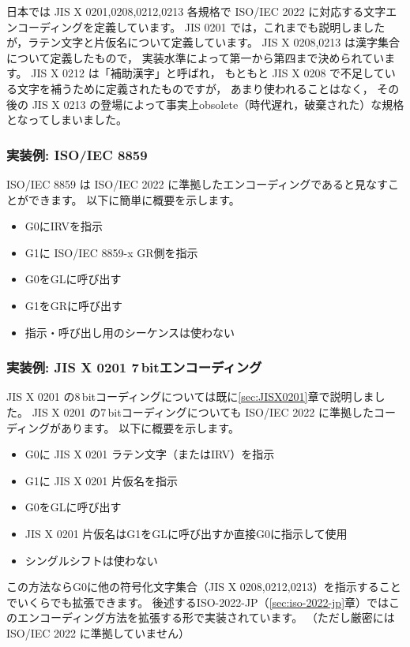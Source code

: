 \documentclass[a4j,10pt,fleqn,uplatex]{jsarticle}
\begin{document}
日本では JIS X 0201,0208,0212,0213 各規格で ISO/IEC 2022 に対応する文字エンコーディングを定義しています。
JIS 0201 では，これまでも説明しましたが，ラテン文字と片仮名について定義しています。
JIS X 0208,0213 は漢字集合について定義したもので，
実装水準によって第一から第四まで決められています。
JIS X 0212 は「補助漢字」と呼ばれ，
もともと JIS X 0208 で不足している文字を補うために定義されたものですが，
あまり使われることはなく，
その後の JIS X 0213 の登場によって事実上obsolete（時代遅れ，破棄された）な規格となってしまいました。

\subsubsection{実装例: ISO/IEC 8859}

ISO/IEC 8859 は ISO/IEC 2022 に準拠したエンコーディングであると見なすことができます。
以下に簡単に概要を示します。
\begin{itemize}
\item G0にIRVを指示
\item G1に ISO/IEC 8859-x GR側を指示
\item G0をGLに呼び出す
\item G1をGRに呼び出す
\item 指示・呼び出し用のシーケンスは使わない
\end{itemize}

\subsubsection{実装例: JIS X 0201 7\,bitエンコーディング} \label{sec:JISX0201-7}

JIS X 0201 の8\,bitコーディングについては既に\ref{sec:JISX0201}章で説明しました。
JIS X 0201 の7\,bitコーディングについても ISO/IEC 2022 に準拠したコーディングがあります。
以下に概要を示します。
\begin{itemize}
\item G0に JIS X 0201 ラテン文字（またはIRV）を指示
\item G1に JIS X 0201 片仮名を指示
\item G0をGLに呼び出す
\item JIS X 0201 片仮名はG1をGLに呼び出すか直接G0に指示して使用
\item シングルシフトは使わない
\end{itemize}

この方法ならG0に他の符号化文字集合（JIS X 0208,0212,0213）を指示することでいくらでも拡張できます。
後述するISO-2022-JP（\ref{sec:iso-2022-jp}章）ではこのエンコーディング方法を拡張する形で実装されています。
（ただし厳密には ISO/IEC 2022 に準拠していません）
\end{document}
